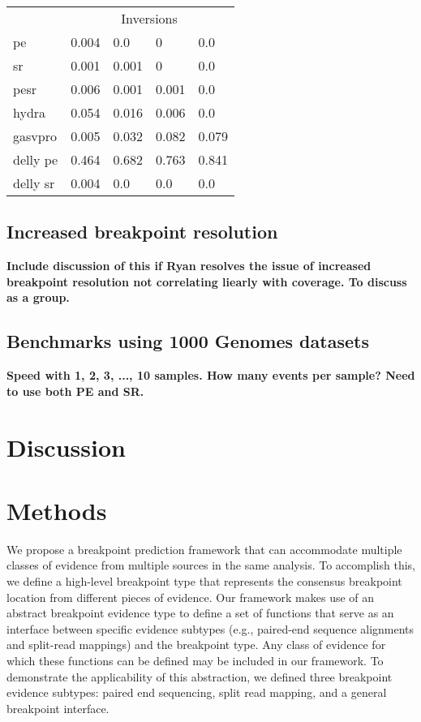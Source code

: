 \documentclass[11pt]{article}
\begin{document}
\begin{table}[h!b!p!]
\begin{tabular}{l|llll}
\cline{2-5}
			& \multicolumn{4}{c}{Inversions} \\
\cline{2-5}
pe          & 0.004			& 0.0           & 0             & 0.0 \\
sr          & 0.001			& 0.001		    & 0             & 0.0 \\
pesr        & 0.006			& 0.001		    & 0.001		    & 0.0 \\
hydra       & 0.054			& 0.016		    & 0.006		    & 0.0 \\
gasvpro     & 0.005			& 0.032		    & 0.082		    & 0.079\\
delly pe    & 0.464			& 0.682			& 0.763		    & 0.841\\
delly sr	& 0.004			& 0.0			& 0.0			& 0.0 \\
\end{tabular}
\label{table:fdr}
\end{table}



\subsection{Increased breakpoint resolution}
\textbf{Include discussion of this if Ryan resolves the issue of increased
breakpoint resolution not correlating liearly with coverage.  To discuss as a 
group.}



\subsection{Benchmarks using 1000 Genomes datasets}
\textbf{Speed with 1, 2, 3, ..., 10 samples.  How many events per sample?
Need to use both PE and SR.}



\section{Discussion}




\section{Methods}

We propose a breakpoint prediction framework that can accommodate multiple
classes of evidence from multiple sources in the same analysis.  To accomplish
this, we define a high-level breakpoint type that represents the consensus
breakpoint location from different pieces of evidence.  Our framework makes use
of an abstract breakpoint evidence type to define a set of functions that serve
as an interface between specific evidence subtypes (e.g., paired-end sequence
alignments and split-read mappings) and the breakpoint type.  Any class of
evidence for which these functions can be defined may be included in our
framework.  To demonstrate the applicability of this abstraction, we defined
three breakpoint evidence subtypes: paired end sequencing, split read mapping,
and a general breakpoint interface. 
\end{document}
